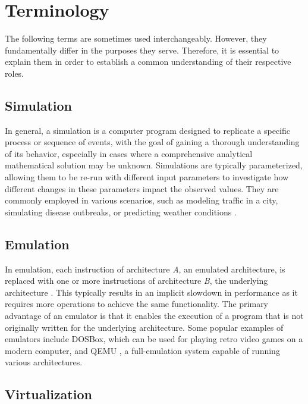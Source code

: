\documentclass[english, ing, kiv, he, iso690numb, pdf]{fasthesis}
\begin{document}
	\section{Terminology}
	
	The following terms are sometimes used interchangeably. However, they fundamentally differ in the purposes they serve. Therefore, it is essential to explain them in order to establish a common understanding of their respective roles.
	
	\subsection{Simulation}
	
	In general, a simulation is a computer program designed to replicate a specific process or sequence of events, with the goal of gaining a thorough understanding of its behavior, especially in cases where a comprehensive analytical mathematical solution may be unknown. Simulations are typically parameterized, allowing them to be re-run with different input parameters to investigate how different changes in these parameters impact the observed values. They are commonly employed in various scenarios, such as modeling traffic in a city, simulating disease outbreaks, or predicting weather conditions \cite{computer-simulations}.
	
	\subsection{Emulation} \label{subsection-Emulation}
	
	In emulation, each instruction of architecture \textit{A}, an emulated architecture, is replaced with one or more instructions of architecture \textit{B}, the underlying architecture \cite{computer-emulation}. This typically results in an implicit slowdown in performance as it requires more operations to achieve the same functionality. The primary advantage of an emulator is that it enables the execution of a program that is not originally written for the underlying architecture. Some popular examples of emulators include \break DOSBox, which can be used for playing retro video games on a modern computer, and QEMU \cite{QEMU}, a full-emulation system capable of running various architectures.
	
	\subsection{Virtualization}
	
\end{document}
